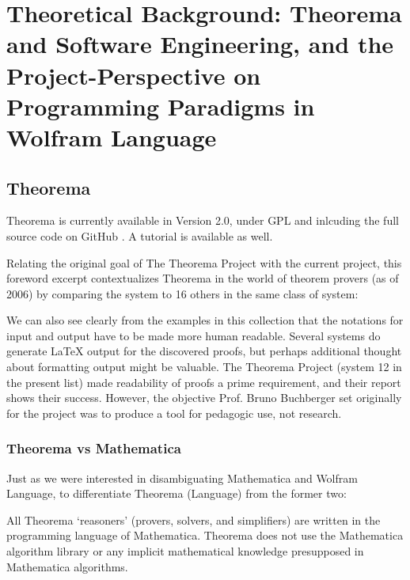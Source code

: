 \chapter[Theoretical Background]{Theoretical Background: Theorema and Software Engineering, and the Project-Perspective on Programming Paradigms in Wolfram Language}
\label{cha:Theory}

\section{Theorema} \label{tma}

Theorema is currently available in Version 2.0, under GPL \cite{noauthor_httpswww3riscjkuatresearchtheoremasoftware_nodate} and inlcuding the full source code on GitHub \cite{noauthor_github_nodate}. A tutorial is available as well. \cite{windsteiger_theorema_2017}

Relating the original goal of The Theorema Project with the current project, this foreword excerpt contextualizes Theorema in the world of theorem provers (as of 2006) by comparing the system to 16 others in the same class of system:

\begin{displayquote}
We can also see clearly from the examples in this collection that the notations
for input and output have to be made more human readable. Several systems do
generate LaTeX output for the discovered proofs, but perhaps additional thought
about formatting output might be valuable. The Theorema Project (system 12
in the present list) made readability of proofs a prime requirement, and their
report shows their success. However, the objective Prof. Bruno Buchberger set
originally for the project was to produce a tool for pedagogic use, not research.
\cite[p. 4]{g_mayrhofer_s_saminger__w_winsteiger_theorema_nodate}
\end{displayquote}

\subsection{Theorema vs Mathematica}

Just as we were interested in disambiguating Mathematica and Wolfram Language, to differentiate Theorema (Language) from the former two:

\begin{displayquote}
All Theorema ‘reasoners’ (provers, solvers, and simplifiers) are written in the programming language of Mathematica. Theorema does not use the Mathematica algorithm library or any implicit mathematical knowledge presupposed in Mathematica algorithms.
\cite[p. 110]{g_mayrhofer_s_saminger__w_winsteiger_theorema_nodate}
\end{displayquote}

